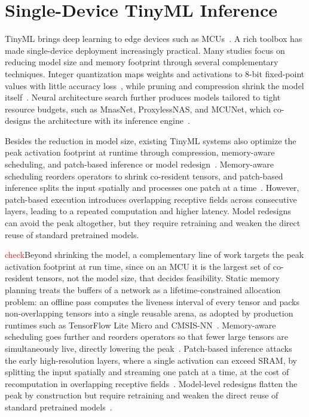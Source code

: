\section{Single-Device TinyML Inference}
\label{sec:bg-single-tinyml}
TinyML brings deep learning to edge devices such as MCUs~\cite{tinyml,tesorflowlite,tinyml-review}.
A rich toolbox has made single-device deployment increasingly practical.
Many studies focus on reducing model size and memory footprint through several complementary techniques.
Integer quantization maps weights and activations to 8-bit fixed-point values with little accuracy loss~\cite{quantize-memory}, while pruning and compression shrink the model itself~\cite{quantize-deepcompress}. 
Neural architecture search further produces models tailored to tight resource budgets, such as MnasNet, ProxylessNAS, and MCUNet, which co-designs the architecture with its inference engine~\cite{mnasnet,proxylessnas,mcunet}.

Besides the reduction in model size, existing TinyML systems also optimize the peak activation footprint at runtime through compression, memory-aware scheduling, and patch-based inference or model redesign~\cite{memory-compression,operator-reordering,mcunetv2,micronets}.
Memory-aware scheduling reorders operators to shrink co-resident tensors, and patch-based inference splits the input spatially and processes one patch at a time~\cite{mcunetv2,operator-reordering}.
However, patch-based execution introduces overlapping receptive fields across consecutive layers, leading to a repeated computation and higher latency.
Model redesigns can avoid the peak altogether, but they require retraining and weaken the direct reuse of standard pretrained models.


\textcolor{red}{check}Beyond shrinking the model, a complementary line of work targets the peak activation footprint at run time, since on an MCU it is the largest set of co-resident tensors, not the model size, that decides feasibility. Static memory planning treats the buffers of a network as a lifetime-constrained allocation problem: an offline pass computes the liveness interval of every tensor and packs non-overlapping tensors into a single reusable arena, as adopted by production runtimes such as TensorFlow Lite Micro and CMSIS-NN~\cite{tflitemicro,cmsisnn}. Memory-aware scheduling goes further and reorders operators so that fewer large tensors are simultaneously live, directly lowering the peak~\cite{operator-reordering}. 
Patch-based inference attacks the early high-resolution layers, where a single activation can exceed SRAM, by splitting the input spatially and streaming one patch at a time, at the cost of recomputation in overlapping receptive fields~\cite{mcunetv2}.
Model-level redesigns flatten the peak by construction but require retraining and weaken the direct reuse of standard pretrained models~\cite{micronets}.

